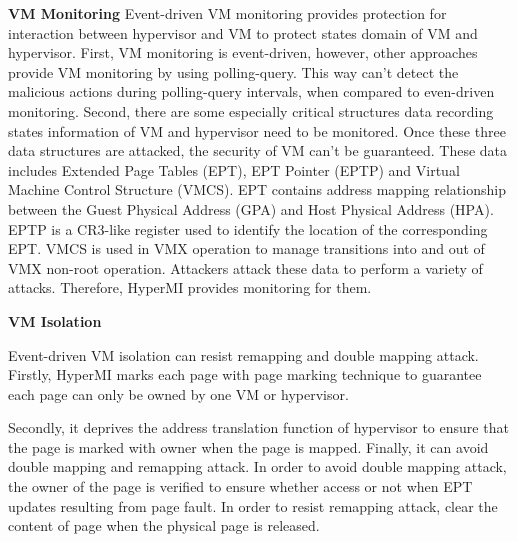 \documentclass[conference]{IEEEtran}
\begin{document}
\textbf{VM Monitoring}
Event-driven VM monitoring provides protection for interaction between hypervisor and VM to protect states domain of VM and hypervisor.
First, VM monitoring is event-driven, however, other approaches provide VM monitoring by using polling-query. This way can't detect the malicious actions during polling-query intervals,
when compared to even-driven monitoring. 
Second, there are some especially critical structures data recording states information of VM and hypervisor need to be monitored. Once these three data structures are attacked, the security of VM can't be guaranteed. These data includes Extended Page Tables (EPT), EPT Pointer (EPTP) and Virtual Machine Control Structure (VMCS). EPT contains address mapping relationship between the Guest Physical Address (GPA) and Host Physical Address (HPA). EPTP is a CR3-like register used to identify the location of the corresponding EPT. VMCS is used in VMX operation to manage transitions into and out of VMX non-root operation. 
Attackers attack these data to perform a variety of attacks. Therefore, HyperMI provides monitoring for them.


\textbf{VM Isolation}

Event-driven VM isolation can resist remapping and double mapping attack.
Firstly, HyperMI marks each page with page marking technique to guarantee each page can only be owned by one VM or hypervisor.

Secondly, it deprives the address translation function of hypervisor to ensure that the page is marked with owner when the page is mapped. 
Finally, it can avoid double mapping and remapping attack. In order to avoid double mapping attack, the owner of the page is verified to ensure whether access or not when EPT updates resulting from page fault. In order to resist remapping attack, clear the content of page when the physical page is released.
\end{document}
